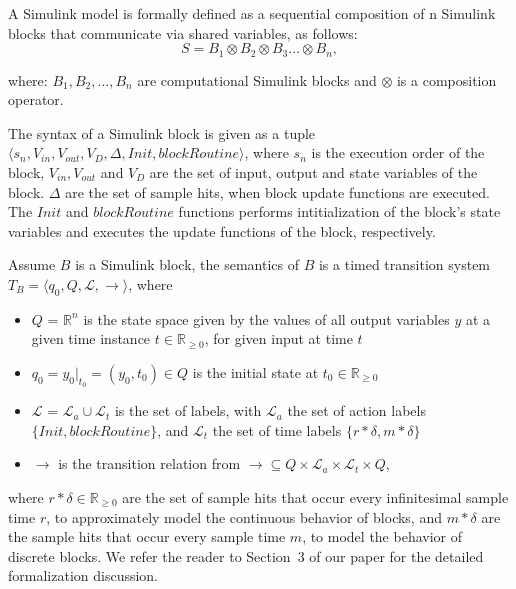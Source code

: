 \begin{definition}
	\label{def:Simmodel}
	A Simulink model is formally defined as a sequential composition of n Simulink blocks that communicate via shared variables, as follows:
	\begin{equation}\label{blocksyntax}
	S = B_1 \otimes B_2 \otimes B_3 \dots \otimes B_n,
	\end{equation}
\end{definition}  
where: $ B_1, B_2, \dots, B_n $ are computational Simulink blocks and $\otimes$ is a  composition operator. 

The syntax of a Simulink block is given as a tuple $\langle s_n, V_{in}, V_{out}, V_{D}, \Delta, Init, blockRoutine \rangle$, where $s_n$ is the execution order of the block, $V_{in},V_{out}$ and $V_{D}$ are the set of input, output and state variables of the block. $\Delta$ are the set of sample hits, when block update functions are executed. The $Init$ and $blockRoutine$ functions performs intitialization of the block's state variables and executes the update functions of the block, respectively.
\begin{definition} 
	\label{def:semantics-Simblock}
	Assume $B$ is a Simulink block, the semantics of $B$ is a timed transition system
	$T_B = \langle q_0, Q, \mathcal{L}, \longrightarrow \rangle$, where 
	\begin{itemize}
		\item $Q$ = $\mathbb{R}^n$ is the state space given by the values of all output variables $y$ at a given time instance $t \in \mathbb{R}_{\geq 0}$, for given input at time $t$
		\item  $q_0 = y_0|_{t_0} = (y_0, t_0) \in Q$ is the initial state at $t_0\in \mathbb{R}_{\geq 0}$
		\item $\mathcal{L}$ = $\mathcal{L}_a \cup \mathcal{L}_t$ is the set of labels, with $\mathcal{L}_a$ the set of action labels $\{Init, blockRoutine\}$, and  $\mathcal{L}_t$ the set of time labels $\{r* \delta, m*\delta\}$
		\item $\longrightarrow$ is the transition relation from $\longrightarrow \subseteq Q \times \mathcal{L}_a \times \mathcal{L}_t \times Q$,
	\end{itemize}
\end{definition}%
where $r*\delta\in \mathbb{R}_{\geq 0}$ are the set of sample hits that occur every infinitesimal sample time $r$, to approximately model the continuous behavior of blocks, and $m*\delta$ are the sample hits that occur every sample time $m$, to model the behavior of discrete blocks. We refer the reader to Section~3 of our paper \cite{Filipovikj2018SimppaalModels} for the detailed formalization discussion.

